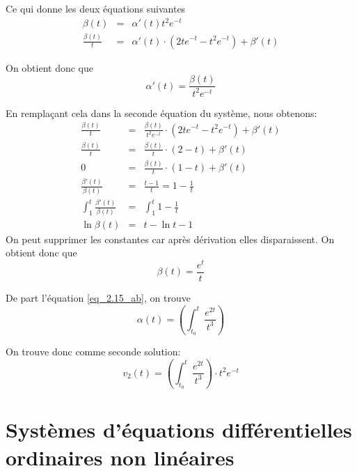 \documentclass{article}
\begin{document}
 Ce qui donne les deux équations suivantes
 \begin{eqnarray}
\beta(t)&=&\alpha'(t)t^2e^{-t}\\
\frac{\beta(t)}{t}&=&\alpha'(t)\cdot \left( 2t e^{-t} -t^2 e^{-t}  \right) +\beta'(t)
\end{eqnarray}

On obtient donc que
\begin{equation}
\alpha'(t) = \frac{\beta(t)}{t^2 e^{-t}} \label{eq_2.15_ab}
\end{equation}

En remplaçant cela dans la seconde équation du système, nous obtenons:
\begin{eqnarray*}
\frac{\beta(t)}{t}&=&\frac{\beta(t)}{t^2 e^{-t}}\cdot \left( 2t e^{-t} -t^2 e^{-t}  \right) +\beta'(t)\\
\frac{\beta(t)}{t}&=&\frac{\beta(t)}{t}\cdot \left( 2-t  \right) +\beta'(t)\\
0&=& \frac{\beta(t)}{t}\cdot \left( 1-t  \right)+\beta'(t)\\
\frac{\beta'(t)}{\beta(t)}&=&\frac{t-1}{t} = 1-\frac{1}{t}\\
\int_1^t \frac{\beta'(t)}{\beta(t)} &=& \int_1^t1-\frac{1}{t}\\
\ln{\beta(t)} &=& t-\ln t - 1
\end{eqnarray*}
On peut supprimer les constantes car après dérivation elles disparaissent.
On obtient donc que
\begin{equation}
\beta(t) = \frac{e^{t}}{t}
\end{equation}

De part l'équation \ref{eq_2.15_ab}, on trouve
\begin{equation}
\alpha(t)= \left( \int_{t_0}^t \frac{e^{2t}}{t^3} \right)
\end{equation}

On trouve donc comme seconde solution:
\begin{equation}
v_2(t) = \left( \int_{t_0}^t \frac{e^{2t}}{t^3} \right) \cdot t^2 e^{-t}
\end{equation}


\section{Systèmes d'équations différentielles ordinaires non linéaires}
\end{document}
